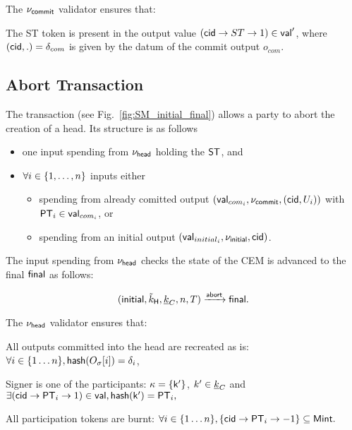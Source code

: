 \noindent The $\nu_\mathsf{commit}$ validator ensures that:
\begin{menumerate}
    \item The ST token is present in the output value $(\mathsf{cid} \rightarrow ST \rightarrow 1) \in \mathsf{val}'$, where $(\mathsf{cid},.) = \delta_{com}$ is given by the datum of the commit output $o_{com}$.
\end{menumerate}

\subsection{Abort Transaction}\label{sec:abort-tx}



The \mtxAbort{} transaction (see Fig.~\ref{fig:SM_initial_final}) allows a party
to abort the creation of a head. Its structure is as follows
\begin{itemize}
  \item one input spending from $\nu_\mathsf{head}$ holding the $\mathsf{ST}$, and
  \item $\forall i \in \{1, \ldots, n\}$ inputs either
    \begin{itemize}
      \item spending from already comitted output $(\mathsf{val}_{com_i}, \nu_\mathsf{commit}, (\mathsf{cid}, U_{i}))$ with $\mathsf{PT}_{i} \in \mathsf{val}_{com_{i}}$, or
      \item spending from an initial output $(\mathsf{val}_{initial_i}, \nu_\mathsf{initial}, \mathsf{cid})$.
    \end{itemize}
\end{itemize}
The input spending from $\nu_\mathsf{head}$ checks the state of the CEM is advanced to the final $\mathsf{final}$ as follows:

$$
   (\mathsf{initial},\tilde{k}_{\mathsf{H}},\underline{k}_C,n,T) \xrightarrow{\mathsf{abort}} \mathsf{final}.
$$

\noindent The $\nu_\mathsf{head}$ validator ensures that:
\begin{menumerate}
 \item All outputs committed into the head are recreated as is: $\forall i \in \{1\dots n\}, \mathsf{hash}(O_\sigma[i]) = \delta_i$,
  \item Signer is one of the participants: $\kappa = \{\mathsf{k'}\}$, $k' \in \underline{k}_C$ and
    $
    \exists (\mathsf{cid} \rightarrow \mathsf{PT}_i \rightarrow 1) \in \mathsf{val}, \mathsf{hash}(\mathsf{k'}) = \mathsf{PT}_i,
    $
 \item All participation tokens are burnt: $\forall i \in \{1\dots n\}, \{\mathsf{cid} \rightarrow \mathsf{PT}_i \rightarrow -1\} \subseteq \mathsf{Mint}.$
\end{menumerate} 

